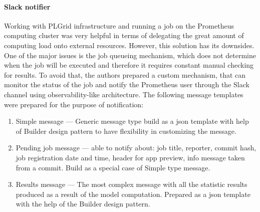 \paragraph{Slack notifier}\label{para:slack-notifier}
Working with PLGrid infrastructure and running a job on the Prometheus computing cluster was very helpful in terms of delegating the great amount of computing load onto external resources.
However, this solution has its downsides.
One of the major issues is the job queueing mechanism, which does not determine when the job will be executed and therefore it requires constant manual checking for results.
To avoid that, the authors prepared a custom mechanism, that can monitor the status of the job and notify the Prometheus user through the Slack channel using observability-like architecture.
The following message templates were prepared for the purpose of notification:
\begin{enumerate}
    \item Simple message --- Generic message type build as a \gls{json} template with help of Builder design pattern to have flexibility in customizing the message.
    \item Pending job message --- able to notify about: job title, reporter, commit hash, job registration date and time, header for app preview, info message taken from a commit.
    Build as a special case of Simple type message.
    \item Results message --- The most complex message with all the statistic results produced as a result of the model computation.
    Prepared as a \gls{json} template with the help of the Builder design pattern.
\end{enumerate}
